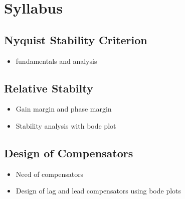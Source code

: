 \documentclass[../course]{subfiles}
\begin{document}
\section{Syllabus}

\subsection{Nyquist Stability Criterion}

\begin{itemize}

    \item fundamentals and analysis

\end{itemize}

\subsection{Relative Stabilty}

\begin{itemize}

    \item Gain margin and phase margin
    \item Stability analysis with bode plot

\end{itemize}

\subsection{Design of Compensators}

\begin{itemize}

    \item Need of compensators
    \item Design of lag and lead compensators using bode plots

\end{itemize}
\end{document}
